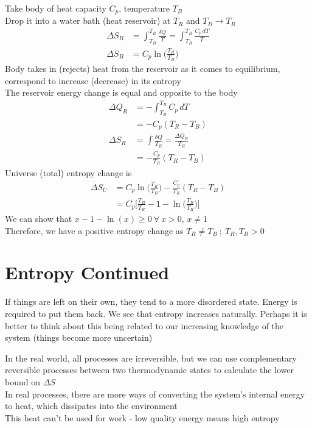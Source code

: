 \documentclass[a4paper, 11pt, normalem]{report}
\begin{document}
Take body of heat capacity $C_p$, temperature $T_B$ \\
Drop it into a water bath (heat reservoir) at $T_R$ and $T_B \to T_R$
\begin{align*}
    \Delta S_{B} &= \int_{T_B}^{T_R} \frac{\delta Q}{T} = \int_{T_B}^{T_R} \frac{C_p \, dT}{T} \\
    \Delta S_{B} &= C_p \ln\Big(\frac{T_R}{T_B}\Big)
\end{align*}
Body takes in (rejects) heat from the reservoir as it comes to equilibrium, correspond to increase (decrease) in its entropy \\
The reservoir energy change is equal and opposite to the body
\begin{align*}
    \Delta Q_{R} &= -\int_{T_B}^{T_R} C_p \, dT \\
                 &= -C_p (T_R - T_B) \\
    \Delta S_{R} &= \int \frac{\delta Q}{T_R} = \frac{\Delta Q_R}{T_R} \\
                 &= -\frac{C_p}{T_R}(T_R - T_B)
\end{align*}
Universe (total) entropy change is
\begin{align*}
    \Delta S_U &= C_p \ln\Big(\frac{T_R}{T_B}\Big) - \frac{C_p}{T_R}(T_R - T_B) \\
               &= C_p \Bigg[\frac{T_B}{T_R} - 1 - \ln\Big(\frac{T_B}{T_R}\Big) \Bigg]
\end{align*}
We can show that $x - 1 - \ln(x) \geq 0 ~\forall ~ x > 0,\, x \neq 1$ \\
Therefore, we have a positive entropy change as $T_R \neq T_B ~;~ T_R, T_B > 0$

\section{Entropy Continued}
If things are left on their own, they tend to a more disordered state.
Energy is required to put them back.
We see that entropy increases naturally.
Perhaps it is better to think about this being related to our increasing knowledge of the system (things become more uncertain)

In the real world, all processes are irreversible, but we can use complementary reversible processes between two thermodynamic states to calculate the lower bound on $\Delta S$ \\
In real processes, there are more ways of converting the system's internal energy to heat, which dissipates into the environment \\
This heat can't be used for work - low quality energy means high entropy
\end{document}
